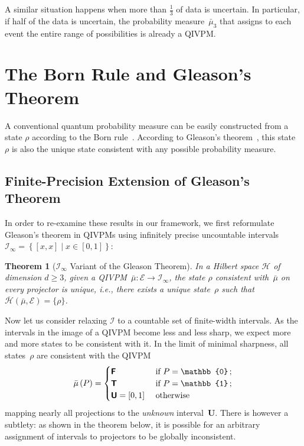 \documentclass[english,reprint, aps, prl,superscriptaddress, showpacs,
showkeys, longbibliography, amsmath, amssymb, floatfix]{revtex4-1}
\theoremstyle{plain}
\newtheorem{thm}{Theorem}
\theoremstyle{definition}
\newcommand{\Hilb}{\mathcal{H}}
\newcommand{\events}{\ensuremath{\mathcal{E}}}
\newcommand{\interval}[1]{{\normalfont\textsf{\textbf{#1}}}}
\newcommand{\imposs}{\interval{F}}
\newcommand{\necess}{\interval{T}}
\newcommand{\unknown}{\interval{U}}
\newcommand{\set}[2]{\ensuremath{\left\{ {#1}\mathrel{}\middle|\mathrel{}{#2}\right\} }}
\newcommand{\coreBorn}{\ensuremath{\overline{\Hilb}}}
\begin{document}
A similar situation happens when more than $\frac{1}{3}$ of data
is uncertain. In particular, if half of the data is uncertain, the probability
measure~$\bar{\mu}_{3}$ that assigns to each event the entire range of possibilities
is already a QIVPM.

\section{The Born Rule and Gleason's Theorem}

\label{sec:Gleason}

A conventional quantum probability measure can be easily constructed
from a state $\rho$ according to the Born
rule~\cite{Born1983bibTeX,Mermin2007,Jaeger2007}.  According
to Gleason's
theorem~\cite{gleason1957,Redhead1987-REDINA,peres1995quantum}, this
state $\rho$ is also the unique state consistent with any possible
probability measure. 

\subsection{Finite-Precision Extension of Gleason's Theorem}

In order to re-examine these results in our
framework, we first reformulate Gleason's theorem in QIVPMs using
infinitely precise uncountable
intervals~$\mathscr{I}_{\infty}=\set{\left[x,x\right]}{x\in\left[0,1\right]}$:

\begin{thm}[$\mathscr{I}_{\infty}$ Variant of the Gleason
  Theorem]\label{cor:Gleason's}In
  a Hilbert space $\Hilb$ of dimension $d\geq3$, given a
  QIVPM~$\bar{\mu}:\events\rightarrow\mathscr{I}_{\infty}$, the state
  $\rho$ consistent with~$\bar{\mu}$ on every projector
  is unique, i.e., there exists a
  unique state~$\rho$ such that
  $\coreBorn\left(\bar{\mu},\events\right)=\{\rho\}$.
  \end{thm}

Now let us consider relaxing $\mathscr{I}$
to a countable set of finite-width intervals.
As the intervals in the image of a QIVPM become less and less sharp,
we expect more and more states to be consistent with it. In
the limit of minimal sharpness, all states~$\rho$
are consistent with the QIVPM
\begin{equation}
\bar{\mu}\left(P\right)=\begin{cases}
\imposs & \textrm{ if }P=\mathbb{0}\,;\\
\necess & \textrm{ if }P=\mathbb{1}\,;\\
\unknown=\left[0,1\right] & \textrm{ otherwise}
\end{cases}
\end{equation}%
mapping nearly all
projections to the \emph{unknown} interval~\unknown. There is however a
subtlety: as shown in
the theorem below, it is possible for an arbitrary assignment of intervals to projectors
to be globally inconsistent.
\end{document}
